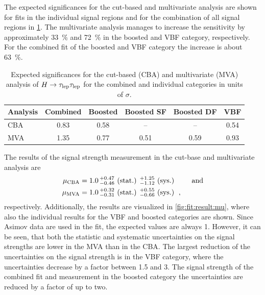 The expected significances for the cut-based and multivariate analysis are shown for fits in the individual signal regions
and for the combination of all signal regions in \cref{tab:fit:result:sigma}.
The multivariate analysis manages to increase the sensitivity by approximately \SI{33}{\percent} and \SI{72}{\percent} in the boosted and VBF category, respectively.
For the combined fit of the boosted and VBF category the increase is about \SI{63}{\percent}.

\begin{table}[htpb]
    \centering
    \caption{Expected significances for the cut-based (CBA) and multivariate (MVA) analysis of $H \to \tau_\text{lep} \tau_\text{lep}$ for the combined and individual categories in units of $\sigma$.}\label{tab:fit:result:sigma}
    \begin{tabular}{lccccc}
        \toprule
        Analysis & Combined & Boosted & Boosted SF & Boosted DF & {VBF} \\ \midrule
        CBA      & 0.83     & 0.58    & --         & --         & 0.54  \\
        MVA      & 1.35     & 0.77    & 0.51       & 0.59       & 0.93  \\
        \bottomrule
    \end{tabular}
\end{table}

The results of the signal strength measurement in the cut-base and multivariate analysis are
\begin{align}
    \mu_\text{CBA} &= 1.0\, {}^{+{0.47}}_{-{0.46}} \text{ (stat.) } {}^{+{1.25}}_{-{1.12}} \text{ (sys.) }  \qquad \text{and} \\
    \mu_\text{MVA} &= 1.0\, {}^{+{0.32}}_{-{0.31}} \text{ (stat.) } {}^{+{0.55}}_{-{0.66}} \text{ (sys.) }  \,,
\end{align}
respectively.
Additionally, the results are visualized in \cref{fig:fit:result:mu}, where also the individual results for the VBF and boosted categories are shown.
Since Asimov data are used in the fit, the expected values are always 1.
However, it can be seen, that both the statistic and systematic uncertainties on the signal strengths are lower in the MVA than in the CBA\@.
The largest reduction of the uncertainties on the signal strength is in the VBF category, where the uncertainties decrease by a factor between 1.5 and 3.
The signal strength of the combined fit and measurement in the boosted category the uncertainties are reduced by a factor of up to two.


